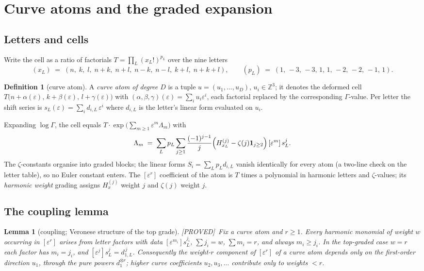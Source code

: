 \documentclass[11pt,reqno]{amsart}
\theoremstyle{plain}
\newtheorem{lemma}[theorem]{Lemma}
\theoremstyle{definition}
\newtheorem{definition}[theorem]{Definition}
\theoremstyle{remark}
\newcommand{\Z}{\mathbb{Z}}
\newcommand{\HH}[2]{H^{(#1)}_{#2}}
\newcommand{\Proved}{\textup{\textsf{[PROVED]}}}
\begin{document}
\section{Curve atoms and the graded expansion}\label{sec:atoms}

\subsection{Letters and cells}
Write the cell as a ratio of factorials
$T=\prod_{L}(x_L!)^{p_L}$ over the nine letters
\[
(x_L)\;=\;(n,\;k,\;l,\;n{+}k,\;n{+}l,\;n{-}k,\;n{-}l,\;k{+}l,\;n{+}k{+}l),
\qquad
(p_L)\;=\;(1,\,-3,\,-3,\,1,\,1,\,-2,\,-2,\,-1,\,1).
\]

\begin{definition}[curve atom]\label{def:atom}
A \emph{curve atom of degree $D$} is a tuple $u=(u_1,\dots,u_D)$,
$u_i\in\Z^3$; it denotes the deformed cell
$T\bigl(n+\alpha(\varepsilon),\,k+\beta(\varepsilon),\,l+\gamma(\varepsilon)\bigr)$
with $(\alpha,\beta,\gamma)(\varepsilon)=\sum_i u_i\varepsilon^i$, each
factorial replaced by the corresponding $\Gamma$-value. Per letter the shift
series is $s_L(\varepsilon)=\sum_i d_{i,L}\,\varepsilon^i$ where $d_{i,L}$ is
the letter's linear form evaluated on $u_i$.
\end{definition}

Expanding $\log\Gamma$, the cell equals
$T\cdot\exp\bigl(\sum_{m\ge1}\varepsilon^m\Lambda_m\bigr)$ with
\begin{equation}\label{eq:Lam}
\Lambda_m\;=\;\sum_L p_L\sum_{j\ge1}\frac{(-1)^{j-1}}{j}
\Bigl(\HH j{x_L}-\zeta(j)\mathbf 1_{j\ge2}\Bigr)\,[\varepsilon^m]\,s_L^j .
\end{equation}
The $\zeta$-constants organise into graded blocks; the linear forms
$S_i=\sum_Lp_Ld_{i,L}$ vanish identically for every atom (a two-line check on
the letter table), so no Euler constant enters. The
$[\varepsilon^r]$ coefficient of the atom is $T$ times a polynomial in
harmonic letters and $\zeta$-values; its \emph{harmonic weight} grading
assigns $\HH jx$ weight $j$ and $\zeta(j)$ weight $j$.

\subsection{The coupling lemma}

\begin{lemma}[coupling; Veronese structure of the top grade]\label{lem:coupling}
\Proved\
Fix a curve atom and $r\ge1$. Every harmonic monomial of weight $w$ occurring
in $[\varepsilon^r]$ arises from letter factors with data
$[\varepsilon^{m_i}]s_L^{j_i}$, $\sum j_i=w$, $\sum m_i=r$, and always
$m_i\ge j_i$. In the top-graded case $w=r$ each factor has $m_i=j_i$, and
$[\varepsilon^{j}]s_L^{j}=d_{1,L}^{\,j}$. Consequently the weight-$r$
component of $[\varepsilon^r]$ of a curve atom depends only on the
first-order direction $u_1$, through the pure powers $d_1^{\otimes r}$;
higher curve coefficients $u_2,u_3,\dots$ contribute only to weights $<r$.
\end{lemma}
\end{document}
